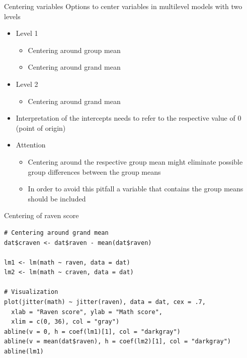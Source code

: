 \documentclass[aspectratio=169]{beamer}
\begin{document}
\begin{frame}{Centering variables}
  Options to center variables in multilevel models with two levels
  \begin{itemize}
    \item Level 1
      \begin{itemize}
        \item Centering around group mean
        \item Centering around grand mean
      \end{itemize}
    \item Level 2
      \begin{itemize}
        \item Centering around grand mean
      \end{itemize}
    \item Interpretation of the intercepts needs to refer to the respective
      value of 0 (point of origin)
    \item Attention
      \begin{itemize}
        \item Centering around the respective group mean might eliminate
          possible group differences between the group means
        \item In order to avoid this pitfall a variable that contains the
          group means should be included
      \end{itemize}
  \end{itemize}
\end{frame}

\begin{frame}[fragile]{Centering of raven score}
  \begin{lstlisting}
# Centering around grand mean
dat$craven <- dat$raven - mean(dat$raven)

lm1 <- lm(math ~ raven, data = dat)
lm2 <- lm(math ~ craven, data = dat)

# Visualization
plot(jitter(math) ~ jitter(raven), data = dat, cex = .7,
  xlab = "Raven score", ylab = "Math score",
  xlim = c(0, 36), col = "gray")
abline(v = 0, h = coef(lm1)[1], col = "darkgray")
abline(v = mean(dat$raven), h = coef(lm2)[1], col = "darkgray")
abline(lm1)
  \end{lstlisting}
\end{frame}
\end{document}
